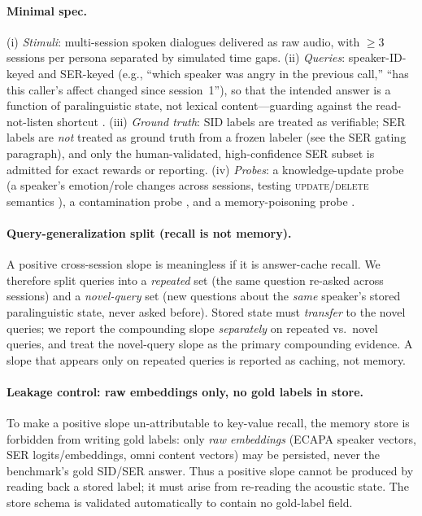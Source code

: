 \paragraph{Minimal spec.} (i) \emph{Stimuli}: multi-session spoken dialogues delivered as raw audio, with $\geq 3$ sessions per persona separated by simulated time gaps. (ii) \emph{Queries}: speaker-ID-keyed and SER-keyed (e.g., ``which speaker was angry in the previous call,'' ``has this caller's affect changed since session~1''), so that the intended answer is a function of paralinguistic state, not lexical content---guarding against the read-not-listen shortcut \citep{voxparadox2026,listenortranscribe2025}. (iii) \emph{Ground truth}: SID labels are treated as verifiable; SER labels are \emph{not} treated as ground truth from a frozen labeler (see the SER gating paragraph), and only the human-validated, high-confidence SER subset is admitted for exact rewards or reporting. (iv) \emph{Probes}: a knowledge-update probe (a speaker's emotion/role changes across sessions, testing \textsc{update}/\textsc{delete} semantics \citealp{mem0_2025}), a contamination probe \citep{contaminationsurvey2024,taskcontamination2024}, and a memory-poisoning probe \citep{agentpoison2024,mempoison2026}.

\paragraph{Query-generalization split (recall is not memory).} A positive cross-session slope is meaningless if it is answer-cache recall. We therefore split queries into a \emph{repeated} set (the same question re-asked across sessions) and a \emph{novel-query} set (new questions about the \emph{same} speaker's stored paralinguistic state, never asked before). Stored state must \emph{transfer} to the novel queries; we report the compounding slope \emph{separately} on repeated vs.\ novel queries, and treat the novel-query slope as the primary compounding evidence. A slope that appears only on repeated queries is reported as caching, not memory.

\paragraph{Leakage control: raw embeddings only, no gold labels in store.} To make a positive slope un-attributable to key-value recall, the memory store is forbidden from writing gold labels: only \emph{raw embeddings} (ECAPA speaker vectors, SER logits/embeddings, omni content vectors) may be persisted, never the benchmark's gold SID/SER answer. Thus a positive slope cannot be produced by reading back a stored label; it must arise from re-reading the acoustic state. The store schema is validated automatically to contain no gold-label field.

